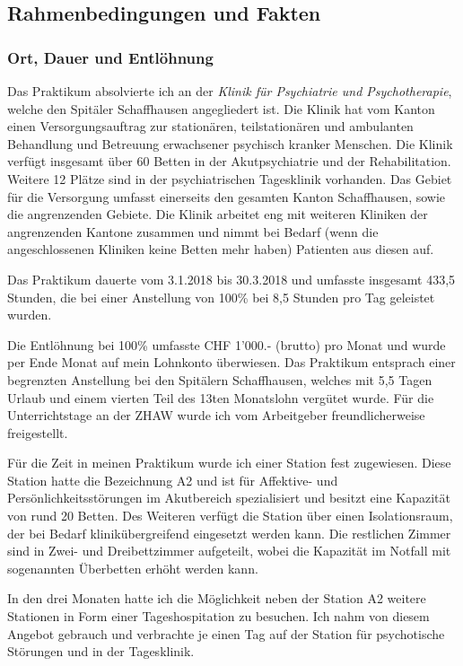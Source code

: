 \subsection{Rahmenbedingungen und Fakten} \label{sec:Rahmenbedingungen}

\subsubsection{Ort, Dauer und Entlöhnung} 
Das Praktikum absolvierte ich an der \textit{Klinik für Psychiatrie und Psychotherapie}, welche den Spitäler Schaffhausen angegliedert ist. Die Klinik hat vom Kanton einen Versorgungsauftrag zur stationären, teilstationären und ambulanten Behandlung und Betreuung erwachsener psychisch kranker Menschen. Die Klinik verfügt insgesamt über 60 Betten in der Akutpsychiatrie und der Rehabilitation. Weitere 12 Plätze sind in der psychiatrischen Tagesklinik vorhanden. Das Gebiet für die Versorgung umfasst einerseits den gesamten Kanton Schaffhausen, sowie die angrenzenden Gebiete. Die Klinik arbeitet eng mit weiteren Kliniken der angrenzenden Kantone zusammen und nimmt bei Bedarf (wenn die angeschlossenen Kliniken keine Betten mehr haben) Patienten aus diesen auf.

Das Praktikum dauerte vom 3.1.2018 bis 30.3.2018 und umfasste insgesamt 433,5 Stunden, die bei einer Anstellung von 100\% bei 8,5 Stunden pro Tag geleistet wurden. 

Die Entlöhnung bei 100\% umfasste CHF 1'000.- (brutto) pro Monat und wurde per Ende Monat auf mein Lohnkonto überwiesen. Das Praktikum entsprach einer begrenzten Anstellung bei den Spitälern Schaffhausen, welches mit 5,5 Tagen Urlaub und einem vierten Teil des 13ten Monatslohn vergütet wurde. Für die Unterrichtstage an der ZHAW wurde ich vom Arbeitgeber freundlicherweise freigestellt. 

Für die Zeit in meinen Praktikum wurde ich einer Station fest zugewiesen. Diese Station hatte die Bezeichnung A2 und ist für Affektive-  und Persönlichkeitsstörungen im Akutbereich spezialisiert und besitzt eine Kapazität von rund 20 Betten. Des Weiteren verfügt die Station über einen Isolationsraum, der bei Bedarf klinikübergreifend eingesetzt werden kann. Die restlichen Zimmer sind in Zwei- und Dreibettzimmer aufgeteilt, wobei die Kapazität im Notfall mit sogenannten Überbetten erhöht werden kann. 

In den drei Monaten hatte ich die Möglichkeit neben der Station A2 weitere Stationen in Form einer Tageshospitation zu besuchen. Ich nahm von diesem Angebot gebrauch und verbrachte je einen Tag auf der Station für psychotische Störungen und in der Tagesklinik. 

